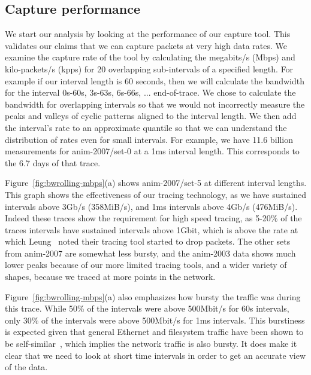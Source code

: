 \subsection{Capture performance}

We start our analysis by looking at the performance of our capture
tool.  This validates our claims that we can capture packets at very
high data rates.  We examine the capture rate of the tool by
calculating the megabits/s (Mbps) and kilo-packets/s (kpps) for
20 overlapping sub-intervals of a specified length.  For example if our
interval length is 60 seconds, then we will calculate the bandwidth
for the interval 0s-60s, 3s-63s, 6s-66s, ... end-of-trace.  We chose
to calculate the bandwidth for overlapping intervals so that we would not
incorrectly measure the peaks and valleys of cyclic patterns aligned to the interval length.
We then add the
interval's rate to an approximate quantile so that we can understand
the distribution of rates even for small intervals.  For example, we
have 11.6 billion measurements for anim-2007/set-0 at a 1ms interval
length.  This corresponds to the 6.7 days of that trace.

Figure~\ref{fig:bwrolling-mbps}(a) shows anim-2007/set-5 at
different interval lengths.  This graph shows the effectiveness of our
tracing technology, as we have sustained intervals above 3Gb/s
(358MiB/s), and 1ms intervals above 4Gb/s (476MiB/s). Indeed these
traces show the requirement for high speed tracing, as 5-20\% of the
traces intervals have sustained intervals above 1Gbit, which is above
the rate at which Leung~\cite{LeungUsenix08} noted their tracing tool
started to drop packets.  The other sets from anim-2007 are somewhat
less bursty, and the anim-2003 data shows much lower peaks because of
our more limited tracing tools, and a wider variety of shapes, because
we traced at more points in the network.

Figure~\ref{fig:bwrolling-mbps}(a) also emphasizes how bursty the traffic was
during this trace. While 50\% of the intervals were above 500Mbit/s for
60s intervals, only 30\% of the intervals were above 500Mbit/s for 1ms
intervals.  This burstiness is expected given that
general Ethernet and filesystem
traffic have been shown to be
self-similar~\cite{Gribble98selfsimilar,Leland94selfsimilar}, which implies the network traffic is also bursty.
It does make it clear that we need to look at short time intervals in
order to get an accurate view of the data.

